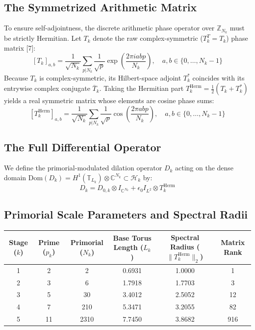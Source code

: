 \documentclass[11pt, a4paper]{article}
\begin{document}
\subsection{The Symmetrized Arithmetic Matrix}
To ensure self-adjointness, the discrete arithmetic phase operator over $\mathbb{Z}_{N_k}$ must be strictly Hermitian. Let $T_k$ denote the raw complex-symmetric ($T_k^T = T_k$) phase matrix [7]:
\[ [T_k]_{a,b} = \frac{1}{\sqrt{N_k}} \sum_{p|N_k} \frac{1}{\sqrt{p}} \exp\left(\frac{2\pi i a b p}{N_k}\right), \quad a,b \in \{0, \dots, N_k-1\} \]
Because $T_k$ is complex-symmetric, its Hilbert-space adjoint $T_k^*$ coincides with its entrywise complex conjugate $\overline{T}_k$. Taking the Hermitian part $T_k^{\mathrm{Herm}} = \frac{1}{2}(T_k + T_k^*)$ yields a real symmetric matrix whose elements are cosine phase sums:
\[ [T_k^{\mathrm{Herm}}]_{a,b} = \frac{1}{\sqrt{N_k}} \sum_{p|N_k} \frac{1}{\sqrt{p}} \cos\left(\frac{2\pi a b p}{N_k}\right), \quad a,b \in \{0, \dots, N_k-1\} \]

\subsection{The Full Differential Operator}
We define the primorial-modulated dilation operator $D_k$ acting on the dense domain $\mathrm{Dom}(D_k) = H^1(\mathbb{T}_{L_k}) \otimes \mathbb{C}^{N_k} \subset \mathcal{H}_k$ by:
\[ D_k = D_{0,k} \otimes I_{\mathbb{C}^{N_k}} + \epsilon_0 I_{L^2} \otimes T_k^{\mathrm{Herm}} \]

\subsection{Primorial Scale Parameters and Spectral Radii}
\begin{table}[h]
\centering
\begin{tabular}{cccccc}
\toprule
Stage ($k$) & Prime ($p_k$) & Primorial ($N_k$) & Base Torus Length ($L_k$) & Spectral Radius ($\|T_k^{\mathrm{Herm}}\|_2$) & Matrix Rank \\
\midrule
1 & 2 & 2 & 0.6931 & 1.0000 & 1 \\
2 & 3 & 6 & 1.7918 & 1.7703 & 3 \\
3 & 5 & 30 & 3.4012 & 2.5052 & 12 \\
4 & 7 & 210 & 5.3471 & 3.2055 & 82 \\
5 & 11 & 2310 & 7.7450 & 3.8682 & 916 \\
\bottomrule
\end{tabular}
\end{table}
\end{document}
